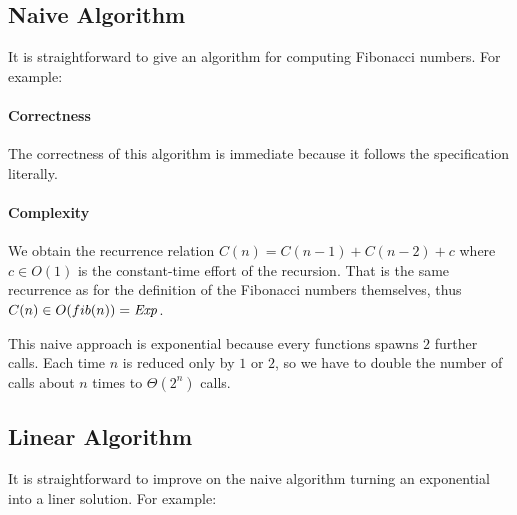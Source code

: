\subsection{Naive Algorithm}\label{sec:ad:fib:naive}

It is straightforward to give an algorithm for computing Fibonacci numbers.
For example:
\begin{acode}
\end{acode}

\paragraph{Correctness}
The correctness of this algorithm is immediate because it follows the specification literally.

\paragraph{Complexity}
We obtain the recurrence relation $C(n)=C(n-1)+C(n-2)+c$ where $c\in O(1)$ is the constant-time effort of the recursion.
That is the same recurrence as for the definition of the Fibonacci numbers themselves, thus $C(n)\in O(fib(n))=\mathit{Exp}$.

This naive approach is exponential because every functions spawns $2$ further calls.
Each time $n$ is reduced only by $1$ or $2$, so we have to double the number of calls about $n$ times to $\Theta(2^n)$ calls.

\subsection{Linear Algorithm}\label{sec:ad:fib:linear}

It is straightforward to improve on the naive algorithm turning an exponential into a liner solution.
For example:
\begin{acode}
\end{acode}

